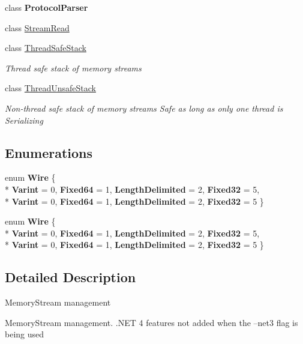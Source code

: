 \begin{DoxyCompactItemize}
class {\bfseries Protocol\+Parser}
\item 
class \hyperlink{class_silent_orbit_1_1_protocol_buffers_1_1_stream_read}{Stream\+Read}
\item 
class \hyperlink{class_silent_orbit_1_1_protocol_buffers_1_1_thread_safe_stack}{Thread\+Safe\+Stack}
\begin{DoxyCompactList}\small\item\em Thread safe stack of memory streams \end{DoxyCompactList}\item 
class \hyperlink{class_silent_orbit_1_1_protocol_buffers_1_1_thread_unsafe_stack}{Thread\+Unsafe\+Stack}
\begin{DoxyCompactList}\small\item\em Non-\/thread safe stack of memory streams Safe as long as only one thread is Serializing \end{DoxyCompactList}\end{DoxyCompactItemize}
\subsection*{Enumerations}
\begin{DoxyCompactItemize}
\item 
\hypertarget{namespace_silent_orbit_1_1_protocol_buffers_a028c6c6bce285110df2b8d94c97b6862}{}enum {\bfseries Wire} \{ \\*
{\bfseries Varint} = 0, 
{\bfseries Fixed64} = 1, 
{\bfseries Length\+Delimited} = 2, 
{\bfseries Fixed32} = 5, 
\\*
{\bfseries Varint} = 0, 
{\bfseries Fixed64} = 1, 
{\bfseries Length\+Delimited} = 2, 
{\bfseries Fixed32} = 5
 \}\label{namespace_silent_orbit_1_1_protocol_buffers_a028c6c6bce285110df2b8d94c97b6862}

\item 
\hypertarget{namespace_silent_orbit_1_1_protocol_buffers_a028c6c6bce285110df2b8d94c97b6862}{}enum {\bfseries Wire} \{ \\*
{\bfseries Varint} = 0, 
{\bfseries Fixed64} = 1, 
{\bfseries Length\+Delimited} = 2, 
{\bfseries Fixed32} = 5, 
\\*
{\bfseries Varint} = 0, 
{\bfseries Fixed64} = 1, 
{\bfseries Length\+Delimited} = 2, 
{\bfseries Fixed32} = 5
 \}\label{namespace_silent_orbit_1_1_protocol_buffers_a028c6c6bce285110df2b8d94c97b6862}

\end{DoxyCompactItemize}


\subsection{Detailed Description}
Memory\+Stream management 

Memory\+Stream management. .N\+E\+T 4 features not added when the --net3 flag is being used 